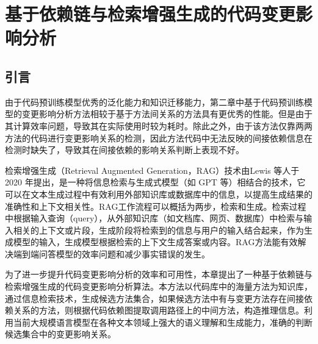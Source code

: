 \chapter{基于依赖链与检索增强生成的代码变更影响分析}

\section{引言}


由于代码预训练模型优秀的泛化能力和知识迁移能力，第二章中基于代码预训练模型的变更影响分析方法相较于基于方法间关系的方法具有更优秀的性能。但是由于其计算效率问题，导致其在实际使用时较为耗时。除此之外，由于该方法仅靠两两方法的代码进行变更影响关系的检测，因此方法代码中无法反映的间接依赖信息在检测时缺失了，导致其在间接依赖的影响关系判断上表现不好。

检索增强生成（Retrieval Augmented Generation，RAG）技术由Lewis 等人\cite{2020Retrieval}于 2020 年提出，是一种将信息检索与生成式模型（如 GPT 等）相结合的技术，它可以在文本生成过程中有效利用外部知识库或数据库中的信息，以提高生成结果的准确性和上下文相关性。RAG工作流程可以概括为两步，检索和生成。检索过程中根据输入查询（query），从外部知识库（如文档库、网页、数据库）中检索与输入相关的上下文或片段，生成阶段将检索到的信息与用户的输入结合起来，作为生成模型的输入，生成模型根据检索的上下文生成答案或内容。RAG方法能有效解决端到端问答模型的效率问题和减少事实错误的发生。

为了进一步提升代码变更影响分析的效率和可用性，本章提出了一种基于依赖链与检索增强生成的代码变更影响分析算法。本方法以代码库中的海量方法为知识库，通过信息检索技术，生成候选方法集合，如果候选方法中有与变更方法存在间接依赖关系的方法，则根据代码依赖图提取调用路径上的中间方法，构造推理信息。利用当前大规模语言模型在各种文本领域上强大的语义理解和生成能力，准确的判断候选集合中的变更影响关系。


